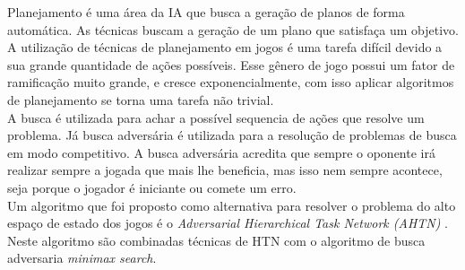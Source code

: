 

Planejamento é uma área da IA que busca a geração de planos de forma automática. As técnicas buscam a geração de um plano que satisfaça um objetivo. A utilização de técnicas de planejamento em jogos é uma tarefa difícil devido a sua grande quantidade de ações possíveis. Esse gênero de jogo possui um fator de ramificação muito grande, e cresce exponencialmente, com isso aplicar algoritmos de planejamento se torna uma tarefa não trivial. \\


A busca é utilizada para achar a possível sequencia de ações que resolve um problema. Já busca adversária é utilizada para a resolução de problemas de busca em modo competitivo. A busca adversária acredita que sempre o oponente irá realizar sempre a jogada que mais lhe beneficia, mas isso nem sempre acontece, seja porque o jogador é iniciante ou comete um erro. \\


Um algoritmo que foi proposto como alternativa para resolver o problema do alto espaço de estado dos jogos é o \textit{Adversarial Hierarchical Task Network (AHTN)} \cite{ontanon2015adversarial}. Neste algoritmo são combinadas técnicas de HTN com o algoritmo de busca adversaria \textit{minimax search}. \\

